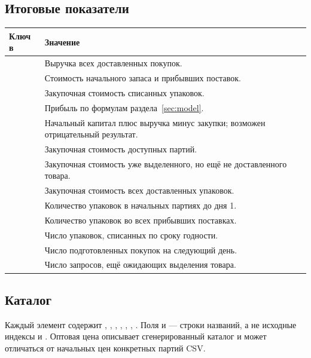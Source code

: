 \subsection{Итоговые показатели}
{\small
\begin{longtable}{@{}L{0.37\textwidth}L{0.56\textwidth}@{}}
\toprule
Ключ в  & Значение \\
\midrule
\endhead
{} & Выручка всех доставленных покупок. \\
 & Стоимость начального запаса и прибывших поставок. \\
 & Закупочная стоимость списанных упаковок. \\
 & Прибыль по формулам раздела~\ref{sec:model}. \\
 & Начальный капитал плюс выручка минус закупки;
возможен отрицательный результат. \\
 & Закупочная стоимость доступных партий. \\
 & Закупочная стоимость уже выделенного,
но ещё не доставленного товара. \\
 & Закупочная стоимость всех доставленных упаковок. \\
 & Количество упаковок в начальных партиях до дня 1. \\
 & Количество упаковок во всех прибывших поставках. \\
 & Число упаковок, списанных по сроку годности. \\
 & Число подготовленных покупок на следующий день. \\
 & Число запросов, ещё ожидающих выделения товара. \\
\bottomrule
\end{longtable}
}

\subsection{Каталог}
Каждый элемент  содержит , ,
, , , ,
. Поля  и  --- строки названий,
а не исходные индексы  и .
Оптовая цена описывает сгенерированный каталог и может отличаться от
начальных цен конкретных партий CSV.

